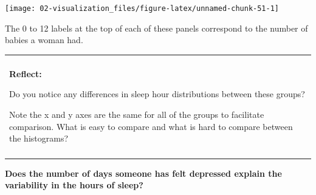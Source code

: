 \documentclass[
]{book}
\newenvironment{Shaded}{\begin{snugshade}}{\end{snugshade}}
\newcommand{\DataTypeTok}[1]{\textcolor[rgb]{0.13,0.29,0.53}{#1}}
\newcommand{\DecValTok}[1]{\textcolor[rgb]{0.00,0.00,0.81}{#1}}
\newcommand{\KeywordTok}[1]{\textcolor[rgb]{0.13,0.29,0.53}{\textbf{#1}}}
\newcommand{\NormalTok}[1]{#1}
\newcommand{\OperatorTok}[1]{\textcolor[rgb]{0.81,0.36,0.00}{\textbf{#1}}}
\newcommand{\StringTok}[1]{\textcolor[rgb]{0.31,0.60,0.02}{#1}}
\newenvironment{reflect}
{
    \begin{center}
    
    \begin{tabular}{|p{0.8\textwidth}|}
    \rowcolor{LightBlue}
    \hline\\
    \rowcolor{LightBlue}
    \textbf{Reflect:}
}
{
    \\\rowcolor{LightBlue}
    \\\hline
    \end{tabular} 
    \end{center}
}
\begin{document}
\begin{Shaded}
\end{Shaded}

\begin{center}\texttt{[image: 02-visualization\_files/figure-latex/unnamed-chunk-51-1]} \end{center}

The 0 to 12 labels at the top of each of these panels correspond to the number of babies a woman had.

\begin{reflect}
Do you notice any differences in sleep hour distributions between these
groups?

Note the x and y axes are the same for all of the groups to facilitate
comparison. What is easy to compare and what is hard to compare between
the histograms?
\end{reflect}

\textbf{Does the number of days someone has felt depressed explain the variability in the hours of sleep?}

\begin{Shaded}
\end{Shaded}
\end{document}
